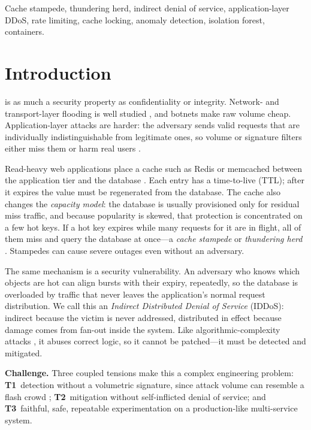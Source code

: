 \documentclass[journal]{IEEEtran}
\begin{document}
\begin{IEEEkeywords}
Cache stampede, thundering herd, indirect denial of service, application-layer DDoS,
rate limiting, cache locking, anomaly detection, isolation forest, containers.
\end{IEEEkeywords}

\section{Introduction}
\label{sec:intro}
 is as much a security property as confidentiality or
integrity. Network- and transport-layer flooding is well studied
\cite{mirkovic2004,zargar2013}, and botnets make raw volume cheap.
Application-layer attacks are harder: the adversary sends valid requests that are
individually indistinguishable from legitimate ones, so volume or signature filters
either miss them or harm real users \cite{praseed2019,xie2009,ranjan2009}.

Read-heavy web applications place a cache such as Redis or memcached between the
application tier and the database \cite{nishtala2013}. Each entry has a
time-to-live (TTL); after it expires the value must be regenerated from the database.
The cache also changes the \emph{capacity model}: the database is usually provisioned
only for residual miss traffic, and because popularity is skewed, that protection is concentrated on a few hot keys. If
a hot key expires while many requests for it are in flight, all of them miss and query
the database at once---a \emph{cache stampede} or \emph{thundering herd}
\cite{vattani2015,nishtala2013}. Stampedes can cause severe outages even without an
adversary.

The same mechanism is a security vulnerability. An adversary who knows which objects
are hot can align bursts with their expiry, repeatedly, so the database is overloaded
by traffic that never leaves the application's normal request distribution. We call
this an \emph{Indirect Distributed Denial of Service} (IDDoS): indirect because the
victim is never addressed, distributed in effect because damage comes from fan-out
inside the system. Like algorithmic-complexity attacks \cite{crosby2003}, it abuses correct logic, so it cannot be patched---it
must be detected and mitigated.

\textbf{Challenge.} Three coupled tensions make this a complex engineering problem:
\textbf{T1}~detection without a volumetric signature, since attack volume can resemble
a flash crowd \cite{jung2002,kandula2005}; \textbf{T2}~mitigation without
self-inflicted denial of service; and \textbf{T3}~faithful, safe, repeatable
experimentation on a production-like multi-service system.
\end{document}
